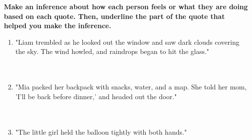 \documentclass[12pt]{article}
\begin{document}
\begin{tcolorbox}[colframe=black!60, colback=white, 
coltitle=black, colbacktitle=black!15, fonttitle=\bfseries\Large, 
title=Independent Practice, halign title=center, left=10pt, right=10pt, top=10pt, bottom=15pt]
\textbf{Make an inference about how each person feels or what they are doing based on each quote. Then, underline the part of the quote that helped you make the inference.}
\begin{enumerate}[itemsep=3em] %
    \item "Liam trembled as he looked out the window and saw dark clouds covering the sky. The wind howled, and raindrops began to hit the glass." 
    \\[0.8cm] \underline{\hspace{15cm}}  
    \\[0.8cm] \underline{\hspace{15cm}} 
    \\[0.8cm] \underline{\hspace{15cm}}
    \item "Mia packed her backpack with snacks, water, and a map. She told her mom, 'I’ll be back before dinner,' and headed out the door." 
    \\[0.8cm] \underline{\hspace{15cm}}  
    \\[0.8cm] \underline{\hspace{15cm}}
    \\[0.8cm] \underline{\hspace{15cm}}
    \item "The little girl held the balloon tightly with both hands."
    \\[0.8cm] \underline{\hspace{15cm}}  
    \\[0.8cm] \underline{\hspace{15cm}}
    \\[0.8cm] \underline{\hspace{15cm}}
\end{enumerate}
\vspace{2em}
\end{tcolorbox}
\end{document}
